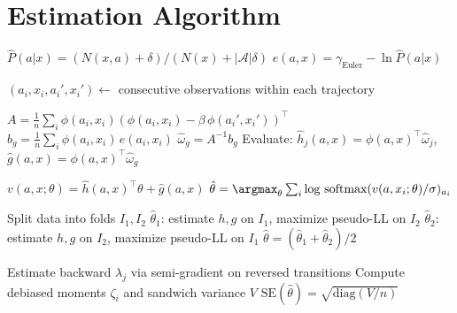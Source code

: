 \documentclass[10pt]{article}
\newcommand{\calA}{\mathcal{A}}
\begin{document}
\section{Estimation Algorithm}

\begin{algorithm}[H]
\DontPrintSemicolon
\caption{TD-CCP, linear semi-gradient with robust SEs \citep{adusumilliEckardt2025}}
\label{alg:tdccp}
\BlankLine

$\hat P(a|x) = (N(x,a) + \delta) / (N(x) + |\calA|\delta)$\;
$e(a,x) = \gamma_{\text{Euler}} - \ln \hat P(a|x)$\;
\BlankLine

$(a_i, x_i, a_i', x_i') \leftarrow$ consecutive observations within each trajectory\;
\BlankLine

$A = \frac{1}{n}\sum_i \phi(a_i,x_i)(\phi(a_i,x_i) - \beta\,\phi(a_i',x_i'))^\top$\;
$b_g = \frac{1}{n}\sum_i \phi(a_i,x_i)\,e(a_i,x_i)$\;
$\hat\omega_g = A^{-1} b_g$\;
Evaluate: $\hat h_j(a,x) = \phi(a,x)^\top\hat\omega_j$, $\hat g(a,x) = \phi(a,x)^\top\hat\omega_g$\;
\BlankLine

$v(a,x;\theta) = \hat h(a,x)^\top\theta + \hat g(a,x)$\;
$\hat\theta = \argmax_\theta \sum_i \log\,\text{softmax}(v(a,x_i;\theta)/\sigma)_{a_i}$ 
\BlankLine

Split data into folds $I_1, I_2$\;
$\hat\theta_1$: estimate $h,g$ on $I_1$, maximize pseudo-LL on $I_2$\;
$\hat\theta_2$: estimate $h,g$ on $I_2$, maximize pseudo-LL on $I_1$\;
$\hat\theta = (\hat\theta_1 + \hat\theta_2)/2$\;
\BlankLine

Estimate backward $\lambda_j$ via semi-gradient on reversed transitions\;
Compute debiased moments $\zeta_i$ and sandwich variance $V$\;
$\text{SE}(\hat\theta) = \sqrt{\text{diag}(V/n)}$\;
\BlankLine

\end{algorithm}
\end{document}
